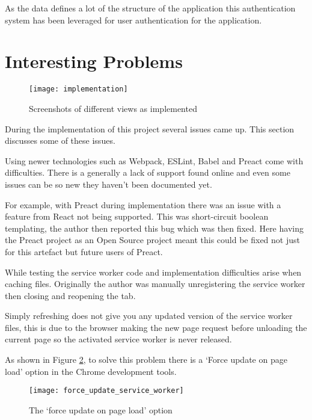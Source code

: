 As the data defines a lot of the structure of the application this authentication system has been leveraged for user authentication for the application.

\section{Interesting Problems} \label{s-i--interesting-problems}

\begin{figure}[H]
  \centering
    \texttt{[image: implementation]}
  \caption{Screenshots of different views as implemented}
  \label{figure-implementation-screenshots}
\end{figure}

During the implementation of this project several issues came up. This section discusses some of these issues.

Using newer technologies such as Webpack, ESLint, Babel and Preact come with difficulties. There is a generally a lack of support found online and even some issues can be so new they haven't been documented yet.

For example, with Preact during implementation there was an issue with a feature from React not being supported. This was short-circuit boolean templating, the author then reported this bug which was then fixed. Here having the Preact project as an Open Source project meant this could be fixed not just for this artefact but future users of Preact.

While testing the service worker code and implementation difficulties arise when caching files. Originally the author was manually unregistering the service worker then closing and reopening the tab.

Simply refreshing does not give you any updated version of the service worker files, this is due to the browser making the new page request before unloading the current page so the activated service worker is never released. \cite{refresh_sw}

As shown in Figure \ref{figure-force-update-service-worker}, to solve this problem there is a `Force update on page load' option in the Chrome development tools.

\begin{figure}[H]
  \centering
    \texttt{[image: force\_update\_service\_worker]}
  \caption{The `force update on page load' option}
  \label{figure-force-update-service-worker}
\end{figure}

